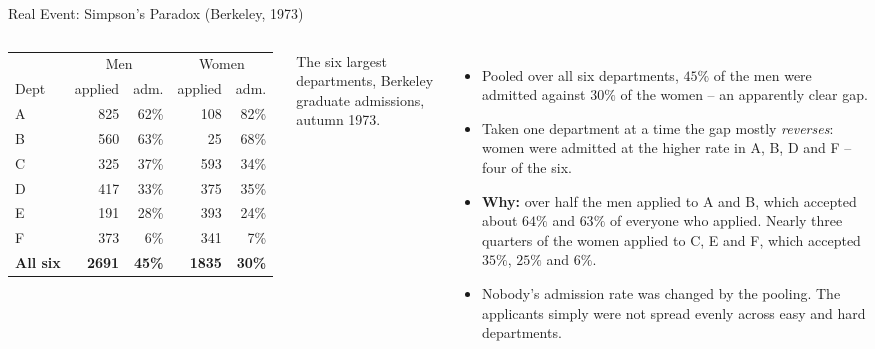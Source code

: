 \begin{frame}{Real Event: Simpson's Paradox (Berkeley, 1973)}
\begin{columns}[T]
\centering
\scriptsize
\begin{tabular}{l|rr|rr}
     & \multicolumn{2}{c|}{Men} & \multicolumn{2}{c}{Women} \\
Dept & applied & adm. & applied & adm. \\
\hline
A & 825 & 62\% & 108 & 82\% \\
B & 560 & 63\% &  25 & 68\% \\
C & 325 & 37\% & 593 & 34\% \\
D & 417 & 33\% & 375 & 35\% \\
E & 191 & 28\% & 393 & 24\% \\
F & 373 &  6\% & 341 &  7\% \\
\hline
\textbf{All six} & \textbf{2691} & \textbf{45\%} & \textbf{1835} & \textbf{30\%} \\
\end{tabular}

\vspace{0.4em}
{\scriptsize The six largest departments, Berkeley graduate admissions, autumn 1973.}
\small
\begin{itemize}
  \item Pooled over all six departments, $45\%$ of the men were admitted against $30\%$ of the women -- an apparently clear gap.
  \pause
  \item Taken one department at a time the gap mostly \emph{reverses}: women were admitted at the higher rate in A, B, D and F -- four of the six.
  \pause
  \item \textbf{Why:} over half the men applied to A and B, which accepted about $64\%$ and $63\%$ of everyone who applied. Nearly three quarters of the women applied to C, E and F, which accepted $35\%$, $25\%$ and $6\%$.
  \pause
  \item Nobody's admission rate was changed by the pooling. The applicants simply were not spread evenly across easy and hard departments.
\end{itemize}
\end{columns}
\end{frame}

